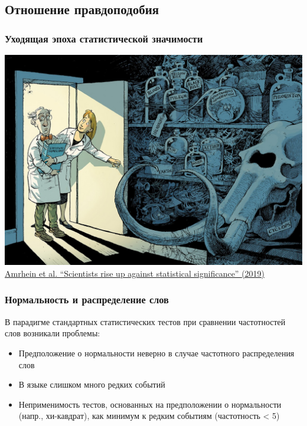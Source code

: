 \documentclass[svgnames]{beamer}
\begin{document}
\subsection{Отношение правдоподобия}

\begin{frame}
  \frametitle{Уходящая эпоха статистической значимости}
  \centering
  \includegraphics[width=.9\textwidth]{significance}
  \footnotesize
  \href{https://www.nature.com/articles/d41586-019-00857-9}{Amrhein et
    al. “Scientists rise up against statistical significance” 
    (2019)}
\end{frame}

\begin{frame}
  \frametitle{Нормальность и распределение слов}
  В парадигме стандартных статистических тестов при сравнении
  частотностей слов возникали проблемы:
  \begin{itemize}
  \item Предположение о нормальности неверно в случае частотного
    распределения слов
  \item В языке слишком много редких событий
  \item Неприменимость тестов, основанных на предположении о
    нормальности (напр., хи-кавдрат), как минимум к редким событиям (частотность < 5)
  \end{itemize}
\end{frame}
\end{document}
